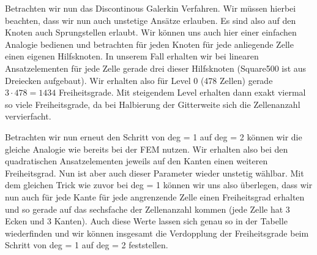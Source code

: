 \begin{figure}[H]
	\centering
\end{figure}

Betrachten wir nun das Discontinous Galerkin Verfahren. Wir müssen hierbei beachten, dass wir nun auch unstetige Ansätze erlauben. Es sind also auf den Knoten auch Sprungstellen erlaubt. Wir können uns auch hier einer einfachen Analogie bedienen und betrachten für jeden Knoten für jede anliegende Zelle einen eigenen Hilfsknoten. In unserem Fall erhalten wir bei linearen Ansatzelementen für jede Zelle gerade drei dieser Hilfsknoten (Square500 ist aus Dreiecken aufgebaut). Wir erhalten also für Level 0 (478 Zellen) gerade $3 \cdot 478 = 1434$ Freiheitsgrade. Mit steigendem Level erhalten dann exakt viermal so viele Freiheitsgrade, da bei Halbierung der Gitterweite sich die Zellenanzahl vervierfacht. 

Betrachten wir nun erneut den Schritt von deg = 1 auf deg = 2 können wir die gleiche Analogie wie bereits bei der FEM nutzen. Wir erhalten also bei den quadratischen Ansatzelementen jeweils auf den Kanten einen weiteren Freiheitsgrad. Nun ist aber auch dieser Parameter wieder unstetig wählbar. Mit dem gleichen Trick wie zuvor bei deg = 1 können wir uns also überlegen, dass wir nun auch für jede Kante für jede angrenzende Zelle einen Freiheitsgrad erhalten und so gerade auf das sechsfache der Zellenanzahl kommen (jede Zelle hat 3 Ecken und 3 Kanten).
Auch diese Werte lassen sich genau so in der Tabelle wiederfinden und wir können insgesamt die Verdopplung der Freiheitsgrade beim Schritt von deg = 1 auf deg = 2 feststellen.





